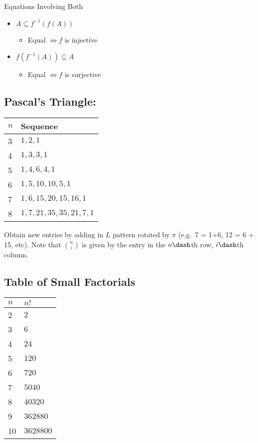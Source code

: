 Equations Involving Both

\begin{itemize}
\tightlist
\item
  \(A \subseteq f^{-1}(f(A))\)

  \begin{itemize}
  \tightlist
  \item
    Equal \(\iff f\) is injective
  \end{itemize}
\item
  \(f(f^{-1}(A)) \subseteq A\)

  \begin{itemize}
  \tightlist
  \item
    Equal \(\iff f\) is surjective
  \end{itemize}
\end{itemize}

\hypertarget{pascals-triangle}{%
\subsection{Pascal's Triangle:}\label{pascals-triangle}}

\begin{longtable}[]{@{}ll@{}}
\toprule
\(n\) & Sequence\tabularnewline
\midrule
\endhead
3 & \(1,2,1\)\tabularnewline
4 & \(1,3,3,1\)\tabularnewline
5 & \(1,4,6,4,1\)\tabularnewline
6 & \(1,5,10,10,5,1\)\tabularnewline
7 & \(1,6,15,20,15,16,1\)\tabularnewline
8 & \(1,7,21,35,35,21,7,1\)\tabularnewline
\bottomrule
\end{longtable}

Obtain new entries by adding in \(L\) pattern rotated by \(\pi\) (e.g.~7
= 1+6, 12 = 6 + 15, etc). Note that \(n\choose i\) is given by the entry
in the \(n\dash\)th row, \(i\dash\)th column.

\hypertarget{table-of-small-factorials}{%
\subsection{Table of Small Factorials}\label{table-of-small-factorials}}

\begin{longtable}[]{@{}ll@{}}
\toprule
\(n\) & \(n!\)\tabularnewline
\midrule
\endhead
2 & \(2\)\tabularnewline
3 & \(6\)\tabularnewline
4 & \(24\)\tabularnewline
5 & \(120\)\tabularnewline
6 & \(720\)\tabularnewline
7 & \(5040\)\tabularnewline
8 & \(40320\)\tabularnewline
9 & \(362880\)\tabularnewline
10 & \(3628800\)\tabularnewline
\bottomrule
\end{longtable}

